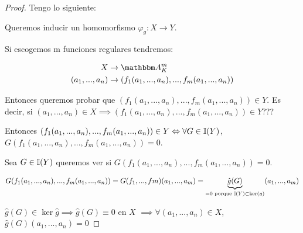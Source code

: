 	\begin{proof}
		Tengo lo siguiente:


		Queremos inducir un homomorfismo $\varphi_g: X \rightarrow Y$.

		Si escogemos m funciones regulares tendremos:


		\begin{align*}
			X & \rightarrow \A_K^m \\
			(a_1,...,a_n) & \rightarrow (f_1(a_1,...,a_n),...,f_m(a_1,...,a_n))
		\end{align*}

		Entonces queremos probar que $(f_1(a_1,...,a_n),...,f_m(a_1,...,a_n)) \in Y$. Es decir, si $(a_1,...,a_n) \in X \implies (f_1(a_1,...,a_n),...,f_m(a_1,...,a_n)) \in Y$???

		Entonces $(f_1(a_1,...,a_n),...,f_m(a_1,...,a_n)) \in Y \Leftrightarrow \forall G \in \mathbb{I}(Y)$, $G(f_1(a_1,...,a_n),...,f_m(a_1,...,a_n))=0$.

		Sea $G\in \mathbb{I}(Y)$ queremos ver si $G(f_1(a_1,...,a_n),...,f_m(a_1,...,a_n))=0$.

		$$G(f_1(a_1,...,a_n),...,f_m(a_1,...,a_n))=G(f_1,...,fm)(a_1,...,a_m)= \underbrace{\hat{g}(G)}_{=0 \text{ porque } \mathbb{I}(Y) \subset \ker(g)}(a_1,...,a_m)$$

		$\hat{g}(G) \in \ker \hat{g} \implies \hat{g}(G) \equiv 0$ en $X$ $\implies \forall(a_1,...,a_n) \in X$, $\hat{g}(G)(a_1,...,a_n)=0$
	\end{proof}


